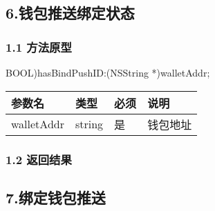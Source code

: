 \documentclass[letterpaper,10pt,english]{sphinxmanual}
\begin{document}
\subsection{6.钱包推送绑定状态}
\label{\detokenize{BCBWalletSDK_u63a5_u53e3_u8bf4_u660e:id32}}

\subsubsection{1.1 方法原型}
\label{\detokenize{BCBWalletSDK_u63a5_u53e3_u8bf4_u660e:id33}}
\sphinxstylestrong{- (}BOOL)hasBindPushID:(NSString *)walletAddr;



\begin{savenotes}\sphinxattablestart
\centering
\begin{tabulary}{\linewidth}[t]{|T|T|T|T|}
\hline
\sphinxstyletheadfamily 
参数名
&\sphinxstyletheadfamily 
类型
&\sphinxstyletheadfamily 
必须
&\sphinxstyletheadfamily 
说明
\\
\hline
walletAddr
&
string
&
是
&
钱包地址
\\
\hline
\end{tabulary}
\par
\sphinxattableend\end{savenotes}


\subsubsection{1.2 返回结果}
\label{\detokenize{BCBWalletSDK_u63a5_u53e3_u8bf4_u660e:id34}}

\begin{sphinxVerbatim}[commandchars=\\\{\}]
 
\end{sphinxVerbatim}


\begin{sphinxVerbatim}[commandchars=\\\{\}]
 
\end{sphinxVerbatim}


\subsection{7.绑定钱包推送}
\label{\detokenize{BCBWalletSDK_u63a5_u53e3_u8bf4_u660e:id35}}
\end{document}
